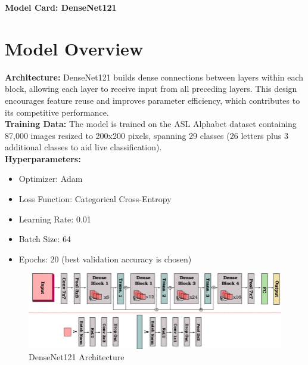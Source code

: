 \documentclass[12pt, a4paper]{article}
\begin{document}
\begin{center}
    \Large\textbf{Model Card: DenseNet121}\\[0.3cm]
\end{center}

\section{Model Overview}
\textbf{Architecture:} DenseNet121 builds dense connections between layers within each block, allowing each layer to receive input from all preceding layers. This design encourages feature reuse and improves parameter efficiency, which contributes to its competitive performance.\\[0.3cm]
\textbf{Training Data:} The model is trained on the ASL Alphabet dataset containing 87,000 images resized to 200x200 pixels, spanning 29 classes (26 letters plus 3 additional classes to aid live classification).\\[0.3cm]
\textbf{Hyperparameters:}
\begin{itemize}
    \item Optimizer: Adam
    \item Loss Function: Categorical Cross-Entropy
    \item Learning Rate: 0.01
    \item Batch Size: 64
    \item Epochs: 20 (best validation accuracy is chosen)
\end{itemize}
\begin{figure}[H]
    \centering
    \includegraphics[width=\textwidth]{../../plots/densenet_architecture.png}
    \caption{DenseNet121 Architecture  \cite{denseSparseStateEstimation}}
    \label{fig:resnet18_architecture}
\end{figure}
\end{document}

